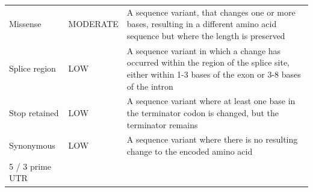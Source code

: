 \documentclass[12pt,twoside]{reedthesis}
\theoremstyle{definition}
\theoremstyle{definition}
\theoremstyle{remark}
\begin{document}
\begin{longtable}[]{@{}lll@{}}
\begin{minipage}[t]{0.18\columnwidth}
  Missense\strut
  \end{minipage} & \begin{minipage}[t]{0.11\columnwidth}\raggedright\strut
  MODERATE\strut
  \end{minipage} & \begin{minipage}[t]{0.63\columnwidth}\raggedright\strut
  A sequence variant, that changes one or more bases, resulting in a
  different amino acid sequence but where the length is preserved\strut
  \end{minipage}\tabularnewline
  \begin{minipage}[t]{0.18\columnwidth}\raggedright\strut
  Splice region\strut
  \end{minipage} & \begin{minipage}[t]{0.11\columnwidth}\raggedright\strut
  LOW\strut
  \end{minipage} & \begin{minipage}[t]{0.63\columnwidth}\raggedright\strut
  A sequence variant in which a change has occurred within the region of
  the splice site, either within 1-3 bases of the exon or 3-8 bases of the
  intron\strut
  \end{minipage}\tabularnewline
  \begin{minipage}[t]{0.18\columnwidth}\raggedright\strut
  Stop retained\strut
  \end{minipage} & \begin{minipage}[t]{0.11\columnwidth}\raggedright\strut
  LOW\strut
  \end{minipage} & \begin{minipage}[t]{0.63\columnwidth}\raggedright\strut
  A sequence variant where at least one base in the terminator codon is
  changed, but the terminator remains\strut
  \end{minipage}\tabularnewline
  \begin{minipage}[t]{0.18\columnwidth}\raggedright\strut
  Synonymous\strut
  \end{minipage} & \begin{minipage}[t]{0.11\columnwidth}\raggedright\strut
  LOW\strut
  \end{minipage} & \begin{minipage}[t]{0.63\columnwidth}\raggedright\strut
  A sequence variant where there is no resulting change to the encoded
  amino acid\strut
  \end{minipage}\tabularnewline
  \begin{minipage}[t]{0.18\columnwidth}\raggedright\strut
  5 / 3 prime UTR\strut
  \end{minipage} & \begin{minipage}[t]{0.11\columnwidth}\raggedright\strut

\end{minipage}
\end{longtable}
\end{document}
